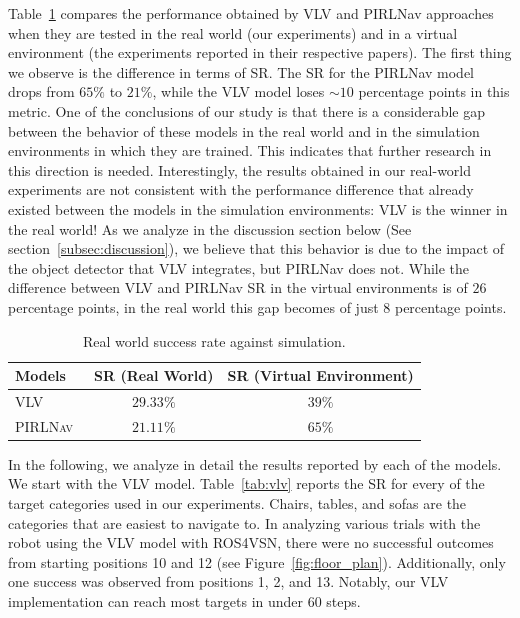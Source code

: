 Table~\ref{tab:results_sota} compares the performance obtained by VLV and PIRLNav approaches when they are tested in the real world (\ie our experiments) and in a virtual environment (\ie the experiments reported in their respective papers).
The first thing we observe is the difference in terms of SR\@.
The SR for the PIRLNav model drops from $65\%$ to $21\%$, while the VLV model loses $\sim10$ percentage points in this metric.
One of the conclusions of our study is that there is a considerable gap between the behavior of these models in the real world and in the simulation environments in which they are trained.
This indicates that further research in this direction is needed.
Interestingly, the results obtained in our real-world experiments are not consistent with the performance difference that already existed between the models in the simulation environments: VLV is the winner in the real world!
As we analyze in the discussion section below (See section~\ref{subsec:discussion}), we believe that this behavior is due to the impact of the object detector that VLV integrates, but PIRLNav does not.
While the difference between VLV and PIRLNav SR in the virtual environments is of $26$ percentage points, in the real world this gap becomes of just $8$ percentage points.

\begin{table}
    \centering
    \begin{tabular}{l|cc}
        \toprule
        \textbf{Models} & SR (Real World) & SR (Virtual Environment) \\
        \midrule
        \textsc{VLV}~\cite{chang2020} & $29.33\%$ & $39\%$ \\
        \textsc{PIRLNav}~\cite{ramrakhya2023} & $21.11\%$ & $65\%$ \\
        \bottomrule
    \end{tabular}
    \caption{Real world success rate against simulation.}
    \label{tab:results_sota}
\end{table}

In the following, we analyze in detail the results reported by each of the models.
We start with the VLV model.
Table~\ref{tab:vlv} reports the SR for every of the target categories used in our experiments.
Chairs, tables, and sofas are the categories that are easiest to navigate to.
In analyzing various trials with the robot using the VLV model with ROS4VSN, there were no successful outcomes from starting positions 10 and 12 (see Figure~\ref{fig:floor_plan}).
Additionally, only one success was observed from positions 1, 2, and 13.
Notably, our VLV implementation can reach most targets in under 60 steps.

